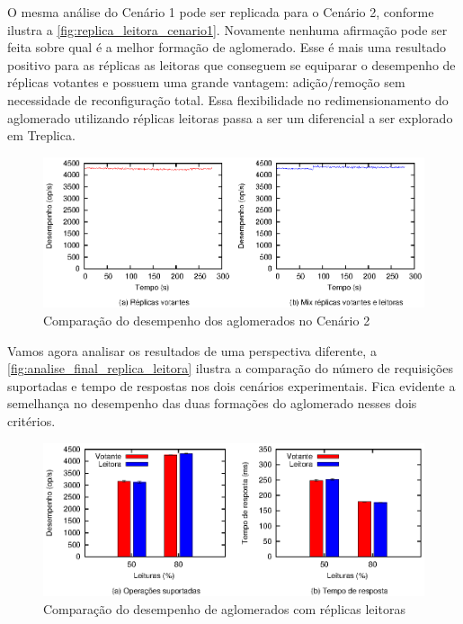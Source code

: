 O mesma análise do Cenário 1 pode ser replicada para o Cenário 2, conforme ilustra a
\autoref{fig:replica_leitora_cenario1}. Novamente nenhuma afirmação pode ser feita sobre
qual é a melhor formação de aglomerado. Esse é mais uma resultado positivo para as réplicas
as leitoras que conseguem se equiparar o desempenho de réplicas votantes e possuem uma
grande vantagem: adição/remoção sem necessidade de reconfiguração total. Essa
flexibilidade no redimensionamento do aglomerado utilizando réplicas leitoras passa a ser
um diferencial a ser explorado em Treplica.

\begin{figure}[ht]
  \centering
  \includegraphics[width=14cm]{conteudo/capitulos/figuras/final-replica-leitora-pr80.eps}
  \caption{Comparação do desempenho dos aglomerados no Cenário 2}
  \label{fig:replica_leitora_cenario2}
\end{figure}

Vamos agora analisar os resultados de uma perspectiva diferente, a
\autoref{fig:analise_final_replica_leitora} ilustra a comparação do número de requisições
suportadas e tempo de respostas nos dois cenários experimentais. Fica evidente a
semelhança no desempenho das duas formações do aglomerado nesses dois critérios.

\begin{figure}[ht]
  \centering
  \includegraphics[width=14cm]{conteudo/capitulos/figuras/final-replica-leitora.eps}
  \caption{Comparação do desempenho de aglomerados com réplicas leitoras}
  \label{fig:analise_final_replica_leitora}
\end{figure}

